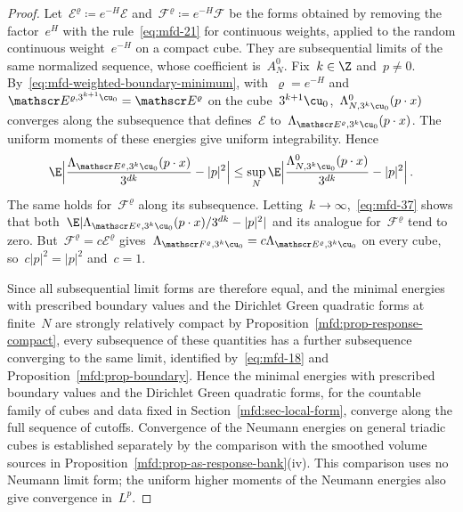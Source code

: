 \documentclass[11pt]{amsart}
\begin{document}
\begin{proof}
Let~$\mathscr E^\varrho\coloneqq e^{-H}\mathscr E$ and~$\mathscr F^\varrho\coloneqq e^{-H}\mathscr F$ be the forms obtained by removing the factor~$e^H$ with the rule~\eqref{eq:mfd-21} for continuous weights, applied to the random continuous weight~$e^{-H}$ on a compact cube. They are subsequential limits of the same normalized sequence, whose coefficient is~$A_N^0$. Fix~$k\in\Z$ and~$p\neq0$. By~\eqref{eq:mfd-weighted-boundary-minimum}, with~$\varrho=e^{-H}$ and~$\mathscr E^{\varrho,3^{k+1}\cu_0}=\mathscr E^\varrho$ on the cube~$3^{k+1}\cu_0$,~$\Lambda_{N,3^k\cu_0}^0(p\cdot x)$ converges along the subsequence that defines~$\mathscr E$ to~$\Lambda_{\mathscr E^\varrho,3^k\cu_0}(p\cdot x)$. The uniform moments of these energies give uniform integrability. Hence
\begin{equation*}
	\E\Bigl|\frac{\Lambda_{\mathscr E^\varrho,3^k\cu_0}(p\cdot x)}{3^{dk}}-|p|^2\Bigr|
	\leq\sup_N\E\Bigl|\frac{\Lambda^0_{N,3^k\cu_0}(p\cdot x)}{3^{dk}}-|p|^2\Bigr|\,.
\end{equation*}
The same holds for~$\mathscr F^\varrho$ along its subsequence. Letting~$k\to\infty$,~\eqref{eq:mfd-37} shows that both~$\E|\Lambda_{\mathscr E^\varrho,3^k\cu_0}(p\cdot x)/3^{dk}-|p|^2|$ and its analogue for~$\mathscr F^\varrho$ tend to zero. But~$\mathscr F^\varrho=c\mathscr E^\varrho$ gives~$\Lambda_{\mathscr F^\varrho,3^k\cu_0}=c\Lambda_{\mathscr E^\varrho,3^k\cu_0}$ on every cube, so~$c|p|^2=|p|^2$ and~$c=1$.

\smallskip

Since all subsequential limit forms are therefore equal, and the minimal energies with prescribed boundary values and the Dirichlet Green quadratic forms at finite~$N$ are strongly relatively compact by Proposition~\ref{mfd:prop-response-compact}, every subsequence of these quantities has a further subsequence converging to the same limit, identified by~\eqref{eq:mfd-18} and Proposition~\ref{mfd:prop-boundary}. Hence the minimal energies with prescribed boundary values and the Dirichlet Green quadratic forms, for the countable family of cubes and data fixed in Section~\ref{mfd:sec-local-form}, converge along the full sequence of cutoffs. Convergence of the Neumann energies on general triadic cubes is established separately by the comparison with the smoothed volume sources in Proposition~\ref{mfd:prop-as-response-bank}(iv). This comparison uses no Neumann limit form; the uniform higher moments of the Neumann energies also give convergence in~$L^p$.
\end{proof}
\end{document}
